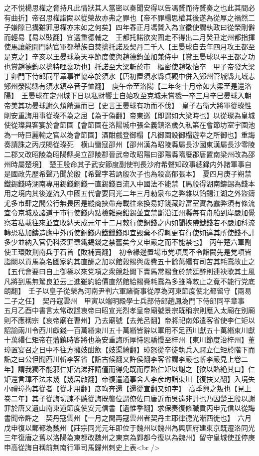 之不悦楊思權之脅持凡此情狀其人當密以奏聞安得以告馮贇而待贇奏之也此其間必有曲折】帝召思權詣闕以從榮故亦弗之罪也【帝不罪楊思權其後遂為從厚之禍然二子嫌隙已搆雖罪思權亦末如之何矣】四年春正月馮贇入為宣徽使謂執政曰從榮剛僻而輕易【易以䜴翻】宜選重德輔之　王都托諾欲突圍走不得出二月癸丑定州都指揮使馬讓能開門納官軍都舉族自焚擒托諾及契丹二千人【王晏球自去年四月攻王都至是克之】辛亥以王晏球為天平節度使與趙德鈞並加兼侍中【賞王晏球以平王都之功也賞趙德鈞以擒特哩衮功也】托諾至大梁斬於市　樞密使趙敬怡卒　甲子帝發大梁　丁卯門下侍郎同平章事崔協卒於須水【唐初置須水縣貞觀中併入鄭州管城縣九域志鄭州滎陽縣有須水鎮卒音子恤翻】　庚午帝至洛陽【二年冬十月帝如大梁至是還洛陽】　王晏球在定州城下日以私財饗士自始攻至克城未嘗戮一卒三月辛巳晏球入朝帝美其功晏球謝久煩饋運而已【史言王晏球有功而不伐】　皇子右衛大將軍從璨性剛安重誨用事從璨不為之屈【為于偽翻】帝東巡【即謂如大梁時也】以從璨為皇城使從璨與客宴於會節園【會節園在洛陽城中張全義鎮洛歲久私第在會節坊室宇園池為一時巨麗輸之官以為會節園】酒酣戲登御榻【凡御園設御榻遊幸之所御也】重誨奏請誅之丙戌賜從璨死　横山蠻寇邵州【邵州漢為昭陵縣屬長沙國東漢屬長沙零陵二郡又改昭陵為昭陽縣吳立邵陵郡晉武帝改昭陽曰邵陽縣隋廢郡唐置南梁州改為邵州時屬楚境】　楚王殷命其子武安節度副使判長沙府希聲知政事總録内外諸軍事自是國政先歷希聲乃聞於殷【希聲字若訥殷次子也為殺高郁張本】　夏四月庚子朔禁鐵錫錢時湖南專用錫錢銅錢一直錫錢百流入中國法不能禁【馬殷得湖南鑄錫為錢本用之境内其後遂流入中國五代會要同光二年三月勅泉布之弊雜以鉛錫江湖之外盜鑄尤多市肆之間公行無畏因是縱商挾帶舟載往來換易好錢藏貯富室實為蠧弊須有條流宜令京城及諸道于市行使錢内點檢雜惡鉛錫並宜禁斷沿江州縣每有舟船到岸嚴加覺察若私載往來並宜收納天成元年十二月敕行使銅錢之内如聞挾帶鐵錢若不嚴加科流轉恐私加鑄造應中外所使銅錢内鐵鑞錢即宜毁棄不得輒更有行使如違其所使錢不計多少並納入官仍科深罪蓋鐵錫錢之禁舊矣今又申嚴之而不能禁也】　丙午楚六軍副使王環敗荆南兵于石首【敗補賣翻】　初令緣邊置場市党項馬不令詣闕先是党項皆詣闕以貢馬為名國家約其直酬之加以館穀賜與歲費五十餘萬緡有司苦其耗蠧故止之【五代會要曰自上御極以來党項之衆競赴闕下賣馬常賜食於禁廷醉則連袂歌其土風凡將到馬無駑良並云上進雖約給價直然館給賜賚耗蠧為多雖降敕止之竟不能行党底朗翻】　壬子以皇子從榮為河南尹判六軍諸衙事從厚為河東節度使北都留守【兩易二子之任】　契丹寇雲州　甲寅以端明殿學士兵部侍郎趙鳳為門下侍郎同平章事　五月乙酉中書言太常改諡衷帝曰昭宣光烈孝皇帝廟號景宗既稱宗則應入太廟在别廟則不應稱宗【哀帝廟在曹州】乃去廟號【去羌呂翻】帝將祀南郊遣客省使李仁矩以詔諭兩川令西川獻錢一百萬緡東川五十萬緡皆辭以軍用不足西川獻五十萬緡東川獻十萬緡仁矩帝在藩鎮時客將也為安重誨所厚恃恩驕慢至梓州【東川節度治梓州】董璋置宴召之日中不往方擁妓酣飲【妓渠綺翻】璋怒從卒徒執兵入驛立仁矩於階下而詬之曰公但聞西川斬李客省【詬古候翻又許侯翻李客省謂李嚴也斬李嚴見上卷二年】謂我獨不能邪仁矩流涕拜請僅而得免既而厚賂仁矩以謝之【欲以賂絶其口】仁矩還言璋不法未幾【幾居啟翻】帝復遣通事舍人李彦珣詣東川【復扶又翻】入境失小禮璋拘其從者【從才用翻】彦珣奔還【還從宣翻又如字】　高季興之叛也【見上卷二年】其子從誨切諫不聽從誨既襲位謂僚佐曰唐近而吳遠非計也乃因楚王殷以謝罪於唐又遺山南東道節度使安元信書【遺惟季翻】求保奏復修職貢丙申元信以從誨書聞帝許之　契丹寇雲州【一月之間再寇雲州者契丹主耶律德光漸西徙也】　六月戊申復以鄴都為魏州【莊宗同光元年即位于魏州以魏州為興唐府建東京既遷洛同光三年復唐之舊以洛陽為東都改魏州之東京為鄴都今復以為魏州】留守皇城使並停庚申高從誨自稱前荆南行軍司馬歸州刺史上表<br />
